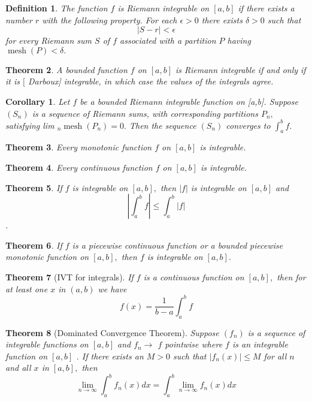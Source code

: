 \documentclass[12pt]{article}
\newtheorem{theorem}{Theorem}[section]
\newtheorem{corollary}{Corollary}[theorem]
\newtheorem{definition}[theorem]{Definition}
\begin{document}
\begin{definition}
	The function $f$ is Riemann integrable on $[ a , b ]$ if there exists a
	number $r$ with the following property. For each $\epsilon > 0$ there exists
	$\delta > 0$ such that $$
	| S - r | < \epsilon
	$$ for every Riemann sum $S$ of $f$ associated with a partition $P$ having
	$\operatorname { mesh } ( P ) < \delta .$ 
\end{definition}
\begin{theorem}
	A bounded function $f$ on $[ a , b ]$ is Riemann integrable if and only if
	it is $[$ Darboux] integrable, in which case the values of the integrals
	agree.
\end{theorem}
\begin{corollary}
	Let $f$ be a bounded Riemann integrable function on [a,b]. Suppose
	$\left( S _ { n } \right)$ is a sequence of Riemann sums, with corresponding partitions $P _ { n } ,$ satisfying lim $_ { n } \operatorname { mesh } \left( P _ { n } \right) = 0 .$ Then the sequence $\left( S _ { n } \right)$ converges
	to $\int _ { a } ^ { b } f .$
\end{corollary}
\begin{theorem}
	Every monotonic function $f$ on $[ a , b ]$ is integrable.
\end{theorem}
\begin{theorem}
	Every continuous function $f$ on $[ a , b ]$ is integrable.
\end{theorem}
\begin{theorem}
	If $f$ is integrable on $[ a , b ] ,$ then $| f |$ is integrable on $[ a , b ]$ and $$
	\left| \int _ { a } ^ { b } f \right| \leq \int _ { a } ^ { b } | f |
	$$.
\end{theorem}
\begin{theorem}
	If $f$ is a piecewise continuous function or a bounded piecewise
	monotonic function on $[ a , b ] ,$ then $f$ is integrable on $[ a , b ] .$
\end{theorem}
\begin{theorem}[IVT for integrals]
	If $f$ is a continuous function on $[ a , b ] ,$ then for at least one $x$ in $( a , b )$
	we have $$
	f ( x ) = \frac { 1 } { b - a } \int _ { a } ^ { b } f
	$$
\end{theorem}
\begin{theorem}[Dominated Convergence Theorem]
	Suppose $\left( f _ { n } \right)$ is a sequence of integrable functions on $[ a , b ]$ and $f _ { n } \rightarrow$
	$f$ pointwise where $f$ is an integrable function on $[ a , b ]$ . If there exists
	an $M > 0$ such that $\left| f _ { n } ( x ) \right| \leq M$ for all $n$ and all $x$ in $[ a , b ] ,$ then $$
	\lim _ { n \rightarrow \infty } \int _ { a } ^ { b } f _ { n } ( x ) d x = \int _ { a } ^ { b } \lim _ { n \rightarrow \infty } f _ { n } ( x ) d x
	$$
\end{theorem}
\end{document}
